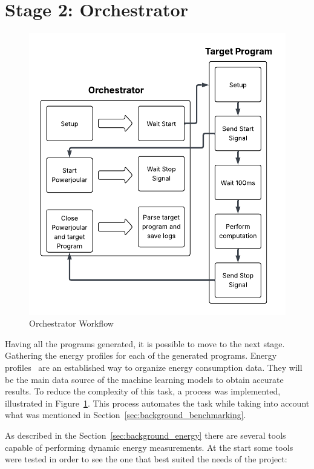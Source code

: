 

\section{Stage 2: Orchestrator} \label{sec:work_stage2_orchestrator}

\begin{figure}[htbp]
  \centering
  \includegraphics[scale = 0.7]{figures/orchestrators_process.pdf}
  \caption{Orchestrator Workflow}
  \label{fig:orchestrators_workflow}
\end{figure}


Having all the programs generated, it is possible to move to the next stage. Gathering the energy profiles for each of the generated programs. 
Energy profiles~\cite{10.1145/2884781.2884869,8816747} are an established way to organize energy consumption data. They will be the main data source of the machine learning models to obtain accurate results. To reduce the complexity of this task, a process was implemented, illustrated in Figure~\ref{fig:orchestrators_workflow}. This process automates the task while taking into account what was mentioned in Section~\ref{sec:background_benchmarking}.

As described in the Section~\ref{sec:background_energy} there are several tools capable of performing dynamic energy measurements.
At the start some tools were tested in order to see the one that best suited the needs of the project:

